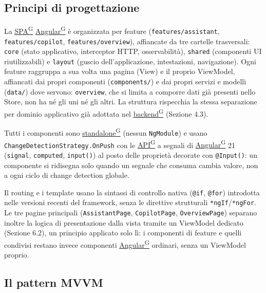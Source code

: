 \documentclass[a4paper,12pt]{article}
\providecommand{\glslink}[2]{\href{https://alittlebyte-19.github.io/Documentazione/glossario.html\#gls-#1}{\underline{#2}\textsuperscript{\scriptsize G}}}
\begin{document}
\begin{sloppypar}

\subsection{Principi di progettazione}

La \glslink{spa-single-page-application}{SPA} \glslink{angular}{Angular} è organizzata per feature (\texttt{features/assistant}, \texttt{features/copilot}, \texttt{features/overview}), affiancate da tre cartelle trasversali: \texttt{core} (stato applicativo, interceptor HTTP, osservabilità), \texttt{shared} (componenti UI riutilizzabili) e \texttt{layout} (guscio dell'applicazione, intestazioni, navigazione). Ogni feature raggruppa a sua volta una pagina (View) e il proprio ViewModel, affiancati dai propri componenti (\texttt{components/}) e dai propri servizi e modelli (\texttt{data/}) dove servono: \texttt{overview}, che si limita a comporre dati già presenti nello Store, non ha né gli uni né gli altri. La struttura rispecchia la stessa separazione per dominio applicativo già adottata nel \glslink{backend}{backend} (Sezione 4.3).

Tutti i componenti sono \glslink{standalone}{standalone} (nessun \texttt{NgModule}) e usano \texttt{ChangeDetectionStrategy.OnPush} con le \glslink{api-application-programming-interface}{API} a segnali di \glslink{angular}{Angular} 21 (\texttt{signal}, \texttt{computed}, \texttt{input()}) al posto delle proprietà decorate con \texttt{@Input()}: un componente si ridisegna solo quando un segnale che consuma cambia valore, non a ogni ciclo di change detection globale.

Il routing e i template usano la sintassi di controllo nativa (\texttt{@if}, \texttt{@for}) introdotta nelle versioni recenti del framework, senza le direttive strutturali \texttt{*ngIf}/\texttt{*ngFor}. Le tre pagine principali (\texttt{AssistantPage}, \texttt{CopilotPage}, \texttt{OverviewPage}) separano inoltre la logica di presentazione dalla vista tramite un ViewModel dedicato (Sezione 6.2), un principio applicato solo lì: i componenti di feature e quelli condivisi restano invece componenti \glslink{angular}{Angular} ordinari, senza un ViewModel proprio.

\subsection{Il pattern MVVM}


\end{sloppypar}
\end{document}
